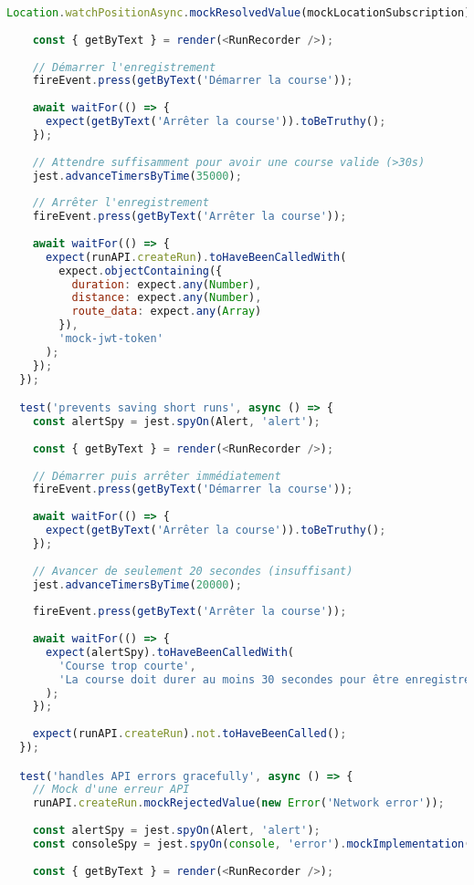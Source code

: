 \begin{lstlisting}[language=javascript, caption=Tests React Native avec Jest et React Native Testing Library]
    Location.watchPositionAsync.mockResolvedValue(mockLocationSubscription);
    
    const { getByText } = render(<RunRecorder />);
    
    // Démarrer l'enregistrement
    fireEvent.press(getByText('Démarrer la course'));
    
    await waitFor(() => {
      expect(getByText('Arrêter la course')).toBeTruthy();
    });
    
    // Attendre suffisamment pour avoir une course valide (>30s)
    jest.advanceTimersByTime(35000);
    
    // Arrêter l'enregistrement
    fireEvent.press(getByText('Arrêter la course'));
    
    await waitFor(() => {
      expect(runAPI.createRun).toHaveBeenCalledWith(
        expect.objectContaining({
          duration: expect.any(Number),
          distance: expect.any(Number),
          route_data: expect.any(Array)
        }),
        'mock-jwt-token'
      );
    });
  });

  test('prevents saving short runs', async () => {
    const alertSpy = jest.spyOn(Alert, 'alert');
    
    const { getByText } = render(<RunRecorder />);
    
    // Démarrer puis arrêter immédiatement
    fireEvent.press(getByText('Démarrer la course'));
    
    await waitFor(() => {
      expect(getByText('Arrêter la course')).toBeTruthy();
    });
    
    // Avancer de seulement 20 secondes (insuffisant)
    jest.advanceTimersByTime(20000);
    
    fireEvent.press(getByText('Arrêter la course'));
    
    await waitFor(() => {
      expect(alertSpy).toHaveBeenCalledWith(
        'Course trop courte',
        'La course doit durer au moins 30 secondes pour être enregistrée.'
      );
    });
    
    expect(runAPI.createRun).not.toHaveBeenCalled();
  });

  test('handles API errors gracefully', async () => {
    // Mock d'une erreur API
    runAPI.createRun.mockRejectedValue(new Error('Network error'));
    
    const alertSpy = jest.spyOn(Alert, 'alert');
    const consoleSpy = jest.spyOn(console, 'error').mockImplementation();
    
    const { getByText } = render(<RunRecorder />);
    

\end{lstlisting}
